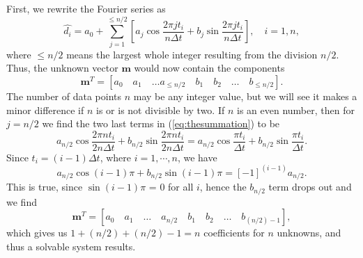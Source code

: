 First, we rewrite the Fourier series as
\begin{equation}
\hat{d_i} = a_0 + \sum^{\leq n/2}_{j=1} \left[ a_j \cos \frac{2 \pi jt_i}{n \Delta t}
 + b_j \sin \frac{2 \pi jt_i}{n \Delta t} \right],\quad i = 1,n,
\label{eq:thesummation}
\end{equation}
where $\leq n/2$ means the largest whole integer resulting from the division $n/2$.
Thus, the unknown vector $\mathbf{m}$ would now contain the components
\begin{equation}
\mathbf{m}^T = \left[ a_0 \quad a_1 \quad \dots a_ {\leq n/2} \quad b_1 \quad b_2 \quad \dots \quad b_{\leq n/2} \right] .
\end{equation}
The number of data points $n$ may be any integer value, but we will see it makes a minor difference if $n$ is or is not divisible by two.
If $n$ is an even number, then for $j = n/2$ we find the two last terms in (\ref{eq:thesummation}) to be
\begin{equation}
a_{n/2} \cos \frac{2 \pi n t_i}{2n \Delta t} + b_{n/2} \sin \frac{2 \pi n t_i}{2n \Delta t} = a_{n/2} \cos \frac { \pi t_i}{ \Delta t} + b_{n/2} \sin \frac{ \pi t_i}{ \Delta t}.
\end{equation}
Since $t_i = (i-1) \Delta t$, where $i = 1, \cdots , n$, we have
\begin{equation}
a_{n/2} \cos (i-1) \pi + b_{n/2} \sin (i-1) \pi = \left[-1 \right]^{(i-1)} a_{n/2}.
\end{equation}
This is true, since $\sin (i-1) \pi$ = 0 for all $i$, hence the $b_{n/2}$ term drops out and we find
\begin{equation}
\mathbf{m}^T = \left[ a_0 \quad a_1 \quad \dots \quad a_{n/2} \quad b_1 \quad b_2 \quad \dots \quad  b_{(n/2)-1} \right],
\end{equation}
which gives us $1 + (n/2) + (n/2) - 1 = n$ coefficients for $n$ unknowns, and thus a solvable system results.

